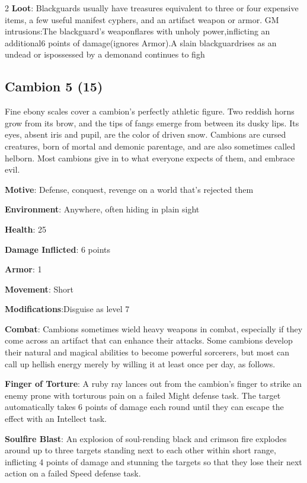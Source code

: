 \begin{multicols}{2}
\textbf{Loot}: Blackguards usually have treasures equivalent to three or four expensive items, a few useful manifest cyphers, and an artifact weapon or armor.
GM intrusions:The blackguard’s weaponflares with unholy power,inflicting an additional6 points of damage(ignores Armor).A slain blackguardrises as an undead or ispossessed by a demonand continues to figh

\subsection{Cambion 5 (15)}

Fine ebony scales cover a cambion’s perfectly athletic figure. Two reddish horns grow from its brow, and the tips of fangs emerge from between its dusky lips. Its eyes, absent iris and pupil, are the color of driven snow. Cambions are cursed creatures, born of mortal and demonic parentage, and are also sometimes called helborn. Most cambions give in to what everyone expects of them, and embrace evil.

\textbf{Motive}: Defense, conquest, revenge on a world that’s rejected them

\textbf{Environment}: Anywhere, often hiding in plain sight

\textbf{Health}: 25

\textbf{Damage Inflicted}: 6 points

\textbf{Armor}: 1

\textbf{Movement}: Short

\textbf{Modifications}:Disguise as level 7

\textbf{Combat}: Cambions sometimes wield heavy weapons in combat, especially if they come across an artifact that can enhance their attacks. Some cambions develop their natural and magical abilities to become powerful sorcerers, but most can call up hellish energy merely by willing it at least once per day, as follows.

\textbf{Finger of Torture}: A ruby ray lances out from the cambion’s finger to strike an enemy prone with torturous pain on a failed Might defense task. The target automatically takes 6 points of damage each round until they can escape the effect with an Intellect task.

\textbf{Soulfire Blast}: An explosion of soul-rending black and crimson fire explodes around up to three targets standing next to each other within short range, inflicting 4 points of damage and stunning the targets so that they lose their next action on a failed Speed defense task.


\end{multicols}
